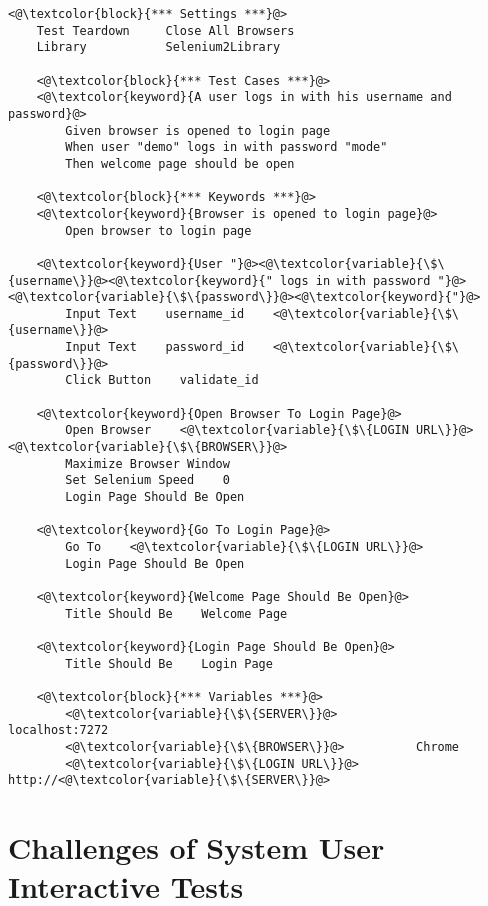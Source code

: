 \begin{minipage}{\linewidth}
\begin{lstlisting}[caption={Example of Robot Framework test}, label={lst:robot}]
    <@\textcolor{block}{*** Settings ***}@>
    Test Teardown     Close All Browsers
    Library           Selenium2Library
    
    <@\textcolor{block}{*** Test Cases ***}@>
    <@\textcolor{keyword}{A user logs in with his username and password}@>
        Given browser is opened to login page
        When user "demo" logs in with password "mode"
        Then welcome page should be open
    
    <@\textcolor{block}{*** Keywords ***}@>
    <@\textcolor{keyword}{Browser is opened to login page}@>
        Open browser to login page
    
    <@\textcolor{keyword}{User "}@><@\textcolor{variable}{\$\{username\}}@><@\textcolor{keyword}{" logs in with password "}@><@\textcolor{variable}{\$\{password\}}@><@\textcolor{keyword}{"}@>
        Input Text    username_id    <@\textcolor{variable}{\$\{username\}}@>
        Input Text    password_id    <@\textcolor{variable}{\$\{password\}}@>
        Click Button    validate_id
    
    <@\textcolor{keyword}{Open Browser To Login Page}@>
        Open Browser    <@\textcolor{variable}{\$\{LOGIN URL\}}@>    <@\textcolor{variable}{\$\{BROWSER\}}@>
        Maximize Browser Window
        Set Selenium Speed    0
        Login Page Should Be Open        
    
    <@\textcolor{keyword}{Go To Login Page}@>
        Go To    <@\textcolor{variable}{\$\{LOGIN URL\}}@>
        Login Page Should Be Open
        
    <@\textcolor{keyword}{Welcome Page Should Be Open}@>
        Title Should Be    Welcome Page
        
    <@\textcolor{keyword}{Login Page Should Be Open}@>
        Title Should Be    Login Page
    
    <@\textcolor{block}{*** Variables ***}@>
        <@\textcolor{variable}{\$\{SERVER\}}@>           localhost:7272
        <@\textcolor{variable}{\$\{BROWSER\}}@>          Chrome        
        <@\textcolor{variable}{\$\{LOGIN URL\}}@>        http://<@\textcolor{variable}{\$\{SERVER\}}@>
\end{lstlisting}
\end{minipage}

\section{Challenges of System User Interactive Tests}


